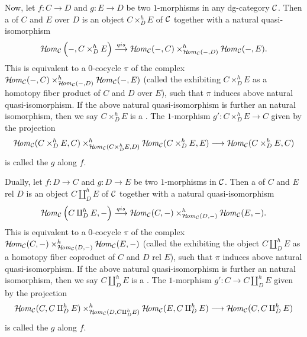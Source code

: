{Now, let $f\colon C\to D$ 
and $g\colon E\to D$ be 
two $1$-morphisms in 
any dg-category ${\cal C}$. 
Then a  of $C$ and $E$ over $D$  
is an object $C\times^h_DE$ of ${\cal C}$ together with a natural quasi-isomorphism 
\[
\operatorname{\mathcal{H}\!\mathit{om}}_{{\cal C}}\Big(-,C\times^h_DE\Big)\stackrel{{qis}}{\longrightarrow} 
\operatorname{\mathcal{H}\!\mathit{om}}_{{\cal C}}(-,C)\times^h_{\operatorname{\mathcal{H}\!\mathit{om}}_{{\cal C}}(-,D)}\operatorname{\mathcal{H}\!\mathit{om}}_{{\cal C}}(-,E).
\]
This is equivalent to a $0$-cocycle $\pi$ of the complex
$\operatorname{\mathcal{H}\!\mathit{om}}_{{\cal C}}(-,C)\times^h_{\operatorname{\mathcal{H}\!\mathit{om}}_{{\cal C}}(-,D)}\operatorname{\mathcal{H}\!\mathit{om}}_{{\cal C}}(-,E)$ 
(called the  
exhibiting $C\times^h_DE$ 
as a homotopy fiber product 
of $C$ and $D$ over $E$),
such that $\pi$ induces above 
natural quasi-isomorphism. 
If the above natural quasi-isomorphism 
is further an natural isomorphism, 
then we say $C\times^h_DE$ is 
a . 
The $1$-morphism $g'\colon C\times^h_DE\to C$ 
given by the projection 
\[
\operatorname{\mathcal{H}\!\mathit{om}}_{{\cal C}}(C\times^h_DE,C)
\times^h_{\operatorname{\mathcal{H}\!\mathit{om}}_{{\cal C}}(C\times^h_DE,D)}
\operatorname{\mathcal{H}\!\mathit{om}}_{{\cal C}}(C\times^h_DE,E)
\longrightarrow
\operatorname{\mathcal{H}\!\mathit{om}}_{{\cal C}}(C\times^h_DE,C)
\]
is called the  $g$ along $f$.

Dually, let $f\colon D\to C$ 
and $g\colon D\to E$ be 
two $1$-morphisms in ${\cal C}$. 
Then a  of $C$ and $E$ rel $D$  
is an object $C\amalg^h_DE$ of ${\cal C}$ together with a natural quasi-isomorphism 
\[
\operatorname{\mathcal{H}\!\mathit{om}}_{{\cal C}}\Big(C\amalg^h_DE,-\Big)\stackrel{{qis}}{\longrightarrow} 
\operatorname{\mathcal{H}\!\mathit{om}}_{{\cal C}}(C,-)\times^h_{\operatorname{\mathcal{H}\!\mathit{om}}_{{\cal C}}(D,-)}\operatorname{\mathcal{H}\!\mathit{om}}_{{\cal C}}(E,-).
\]
This is equivalent to a $0$-cocycle $\pi$ of the complex
$\operatorname{\mathcal{H}\!\mathit{om}}_{{\cal C}}(C,-)\times^h_{\operatorname{\mathcal{H}\!\mathit{om}}_{{\cal C}}(D,-)}\operatorname{\mathcal{H}\!\mathit{om}}_{{\cal C}}(E,-)$ 
(called the  
exhibiting the object $C\amalg^h_DE$ 
as a homotopy fiber coproduct 
of $C$ and $D$ rel $E$),
such that $\pi$ induces above 
natural quasi-isomorphism. 
If the above natural quasi-isomorphism 
is further an natural isomorphism, 
then we say $C\amalg^h_DE$ is 
a . 
The $1$-morphism $g'\colon C\to C\amalg^h_DE$ 
given by the projection 
\[
\operatorname{\mathcal{H}\!\mathit{om}}_{{\cal C}}(C,C\amalg^h_DE)
\times^h_{\operatorname{\mathcal{H}\!\mathit{om}}_{{\cal C}}(D,C\amalg^h_DE)}
\operatorname{\mathcal{H}\!\mathit{om}}_{{\cal C}}(E,C\amalg^h_DE)
\longrightarrow
\operatorname{\mathcal{H}\!\mathit{om}}_{{\cal C}}(C,C\amalg^h_DE)
\]
is called the  $g$ along $f$.

}
